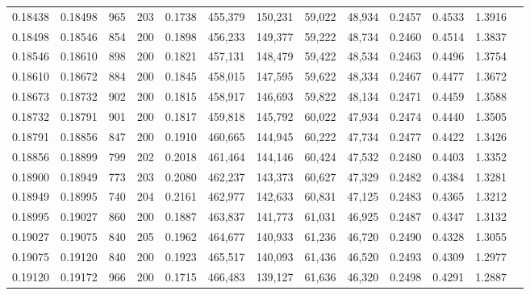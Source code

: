 \begin{tabular}{rrrrrrrrrrrrr}
0.18438 & 0.18498 &   965 & 203 &                                     0.1738 & 455,379 & 150,231 &  59,022 &  48,934 & 0.2457 & 0.4533 & 1.3916 \\
0.18498 & 0.18546 &   854 & 200 &                                     0.1898 & 456,233 & 149,377 &  59,222 &  48,734 & 0.2460 & 0.4514 & 1.3837 \\
0.18546 & 0.18610 &   898 & 200 &                                     0.1821 & 457,131 & 148,479 &  59,422 &  48,534 & 0.2463 & 0.4496 & 1.3754 \\
0.18610 & 0.18672 &   884 & 200 &                                     0.1845 & 458,015 & 147,595 &  59,622 &  48,334 & 0.2467 & 0.4477 & 1.3672 \\
0.18673 & 0.18732 &   902 & 200 &                                     0.1815 & 458,917 & 146,693 &  59,822 &  48,134 & 0.2471 & 0.4459 & 1.3588 \\
0.18732 & 0.18791 &   901 & 200 &                                     0.1817 & 459,818 & 145,792 &  60,022 &  47,934 & 0.2474 & 0.4440 & 1.3505 \\
0.18791 & 0.18856 &   847 & 200 &                                     0.1910 & 460,665 & 144,945 &  60,222 &  47,734 & 0.2477 & 0.4422 & 1.3426 \\
0.18856 & 0.18899 &   799 & 202 &                                     0.2018 & 461,464 & 144,146 &  60,424 &  47,532 & 0.2480 & 0.4403 & 1.3352 \\
0.18900 & 0.18949 &   773 & 203 &                                     0.2080 & 462,237 & 143,373 &  60,627 &  47,329 & 0.2482 & 0.4384 & 1.3281 \\
0.18949 & 0.18995 &   740 & 204 &                                     0.2161 & 462,977 & 142,633 &  60,831 &  47,125 & 0.2483 & 0.4365 & 1.3212 \\
0.18995 & 0.19027 &   860 & 200 &                                     0.1887 & 463,837 & 141,773 &  61,031 &  46,925 & 0.2487 & 0.4347 & 1.3132 \\
0.19027 & 0.19075 &   840 & 205 &                                     0.1962 & 464,677 & 140,933 &  61,236 &  46,720 & 0.2490 & 0.4328 & 1.3055 \\
0.19075 & 0.19120 &   840 & 200 &                                     0.1923 & 465,517 & 140,093 &  61,436 &  46,520 & 0.2493 & 0.4309 & 1.2977 \\
0.19120 & 0.19172 &   966 & 200 &                                     0.1715 & 466,483 & 139,127 &  61,636 &  46,320 & 0.2498 & 0.4291 & 1.2887 \\

\end{tabular}

